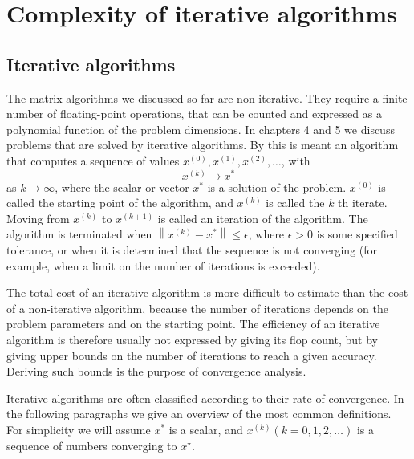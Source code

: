 \chapter{Complexity of iterative algorithms}

\section{Iterative algorithms}

The matrix algorithms we discussed so far are non-iterative. They require a finite number of floating-point operations, that can be counted and expressed as a polynomial function of the problem dimensions. In chapters 4 and 5 we discuss problems that are solved by iterative algorithms. By this is meant an algorithm that computes a sequence of values $ x^{(0)}, x^{(1)}, x^{(2)}, \ldots $, with
\begin{equation}
x^{(k)} \rightarrow x^{*}
\end{equation}
as $ k \rightarrow \infty $, where the scalar or vector $ x^{*} $ is a solution of the problem. $ x^{(0)} $ is called the starting point of the algorithm, and $ x^{(k)} $ is called the $ k $ th iterate. Moving from $ x^{(k)} $ to $ x^{(k+1)} $ is called an iteration of the algorithm. The algorithm is terminated when $ \left\|x^{(k)}-x^{*}\right\| \leq \epsilon $, where $ \epsilon>0 $ is some specified tolerance, or when it is determined that the sequence is not converging (for example, when a limit on the number of iterations is exceeded).

The total cost of an iterative algorithm is more difficult to estimate than the cost of a non-iterative algorithm, because the number of iterations depends on the problem parameters and on the starting point. The efficiency of an iterative algorithm is therefore usually not expressed by giving its flop count, but by giving upper bounds on the number of iterations to reach a given accuracy. Deriving such bounds is the purpose of convergence analysis.

Iterative algorithms are often classified according to their rate of convergence. In the following paragraphs we give an overview of the most common definitions. For simplicity we will assume $ x^{*} $ is a scalar, and $ x^{(k)}(k=0,1,2, \ldots) $ is a sequence of numbers converging to $ x^{\star} $.

